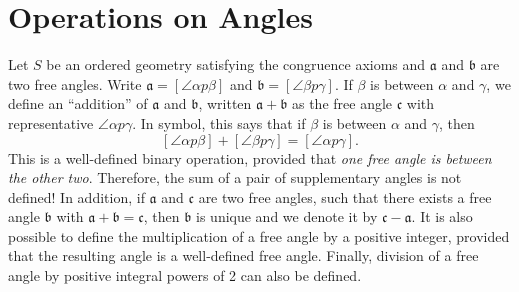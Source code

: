 \documentclass[12pt]{article}
\begin{document}
\section{Operations on Angles}
Let $S$ be an ordered geometry satisfying the congruence axioms and
$\mathfrak{a}$ and $\mathfrak{b}$ are two free angles.  Write
$\mathfrak{a}=[\angle\alpha p\beta]$ and $\mathfrak{b}=[\angle\beta
p\gamma]$.  If $\beta$ is between $\alpha$ and $\gamma$, we define
an ``addition'' of $\mathfrak{a}$ and $\mathfrak{b}$, written
$\mathfrak{a}+\mathfrak{b}$ as the free angle $\mathfrak{c}$ with
representative $\angle\alpha p\gamma$.  In symbol, this says that if
$\beta$ is between $\alpha$ and $\gamma$, then $$[\angle \alpha
p\beta]+[\angle \beta p\gamma]=[\angle \alpha p\gamma].$$ This is a
well-defined binary operation, provided that \emph{one free angle is
between the other two}.  Therefore, the sum of a pair of
supplementary angles is not defined!  In addition, if $\mathfrak{a}$
and $\mathfrak{c}$ are two free angles, such that there exists a
free angle $\mathfrak{b}$ with
$\mathfrak{a}+\mathfrak{b}=\mathfrak{c}$, then $\mathfrak{b}$ is
unique and we denote it by $\mathfrak{c}-\mathfrak{a}$.  It is also
possible to define the multiplication of a free angle by a positive
integer, provided that the resulting angle is a well-defined free
angle. Finally, division of a free angle by positive integral powers
of 2 can also be defined.
\end{document}
